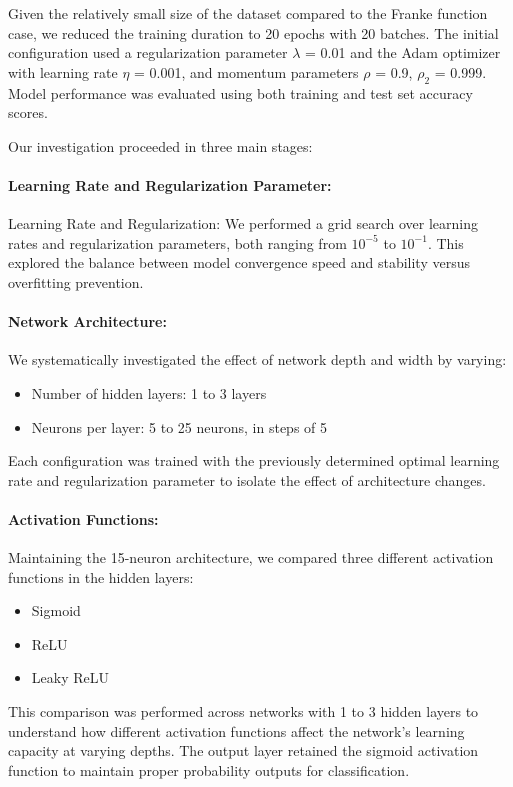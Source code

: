 \documentclass[aps,pra,english,notitlepage,reprint,nofootinbib]{revtex4-1}  %
\begin{document}
Given the relatively small size of the dataset compared to the Franke function case, we reduced the training duration to 20 epochs with 20 batches. The initial configuration used a regularization parameter \( \lambda \) = 0.01 and the Adam optimizer with learning rate \( \eta \) = 0.001, and momentum parameters \( \rho \) = 0.9, \( \rho_2 \) = 0.999. Model performance was evaluated using both training and test set accuracy scores.

Our investigation proceeded in three main stages:

\paragraph*{Learning Rate and Regularization Parameter:}
Learning Rate and Regularization: We performed a grid search over learning rates and regularization parameters, both ranging from \( 10^{-5} \) to \( 10^{-1} \). This explored the balance between model convergence speed and stability versus overfitting prevention.

\paragraph*{Network Architecture:}
We systematically investigated the effect of network depth and width by varying:
\begin{itemize}
    \item Number of hidden layers: 1 to 3 layers
    \item Neurons per layer: 5 to 25 neurons, in steps of 5
\end{itemize}
Each configuration was trained with the previously determined optimal learning rate and regularization parameter to isolate the effect of architecture changes.

\paragraph*{Activation Functions:}
Maintaining the 15-neuron architecture, we compared three different activation functions in the hidden layers:
\begin{itemize}
    \item Sigmoid
    \item ReLU
    \item Leaky ReLU
\end{itemize}
This comparison was performed across networks with 1 to 3 hidden layers to understand how different activation functions affect the network's learning capacity at varying depths. The output layer retained the sigmoid activation function to maintain proper probability outputs for classification.
\end{document}
